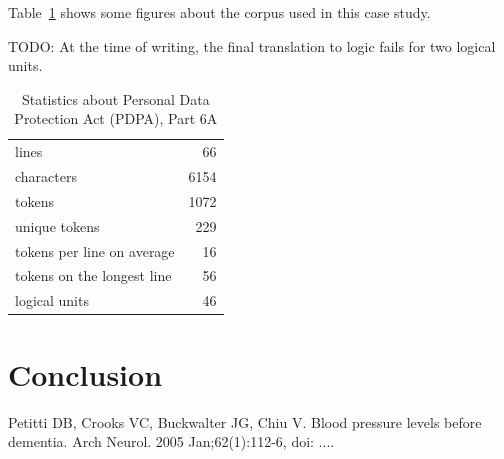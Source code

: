 \documentclass{IOS-Book-Article}
\begin{document}
Table~\ref{stats} shows some figures about the corpus used in this case study.

TODO: At the time of writing, the final translation to logic fails for two logical units.


\begin{table}
  \begin{tabular}{|l|r|}
\hline
lines & 66 \\
characters & 6154 \\
tokens & 1072 \\
unique tokens & 229 \\
tokens per line on average & 16 \\
tokens on the longest line & 56 \\
logical units & 46 \\
\hline
  \end{tabular}
  \caption{Statistics about Personal Data Protection Act (PDPA), Part 6A}
  \label{stats}
\end{table}


\section{Conclusion}


\begin{thebibliography}{99}


Petitti DB, Crooks VC, Buckwalter JG, Chiu V. Blood pressure levels before dementia.
Arch Neurol. 2005 Jan;62(1):112-6, doi: ....

\end{thebibliography}
\end{document}
